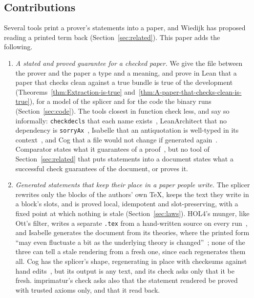 \documentclass[acmsmall,screen,review,anonymous,nonacm]{acmart}
\begin{document}
\subsection{Contributions}\label{sec:contributions}

Several tools print a prover's statements into a paper, and Wiedijk has
proposed reading a printed term back (Section~\ref{sec:related}). This
paper adds the following.

\begin{enumerate}
\item \emph{A stated and proved guarantee for a checked paper.} We give the
  file between the prover and the paper a type and a meaning, and prove in
  Lean that a paper that checks clean against a true bundle is true of the
  development (Theorems~\ref{thm:Extraction-is-true}
  and~\ref{thm:A-paper-that-checks-clean-is-true}), for a model of the
  splicer and for the code the binary runs
  (Section~\ref{sec:code}). The tools closest in function check less, and
  say so informally: \texttt{checkdecls} that each name
  exists~\cite{Massot20}, LeanArchitect that no dependency is
  \texttt{sorryAx}~\cite{Zhu26}, Isabelle that an antiquotation is
  well-typed in its context~\cite{Wenzel26}, and Cog that a file would not
  change if generated again~\cite{Batchelder25}. Comparator states what
  it guarantees of a proof~\cite{Boving25}, but no tool of
  Section~\ref{sec:related} that puts statements into a document states
  what a successful check guarantees of the document, or proves it.
\item \emph{Generated statements that keep their place in a paper people
  write.} The splicer rewrites only the blocks of the authors' own
  \TeX{}, keeps the text they write in a block's slots, and is proved
  local, idempotent and slot-preserving, with a fixed point at which
  nothing is stale (Section~\ref{sec:laws}). HOL4's munger, like Ott's
  filter, writes a separate \verb|.tex| from a hand-written source on every
  run~\cite{HOL25,Sewell10}, and Isabelle generates the document from its
  theories, where the printed form ``may even fluctuate a bit as the
  underlying theory is changed''~\cite{Wenzel26}; none of the three can
  tell a stale rendering from a fresh one, since each regenerates them
  all. Cog has the
  splicer's shape, regenerating in place with checksums against hand
  edits~\cite{Batchelder25}, but its output is any text, and its check asks
  only that it be fresh. imprimatur's check asks also that the statement
  rendered be proved with trusted axioms only, and that it read back.

\end{enumerate}
\end{document}
